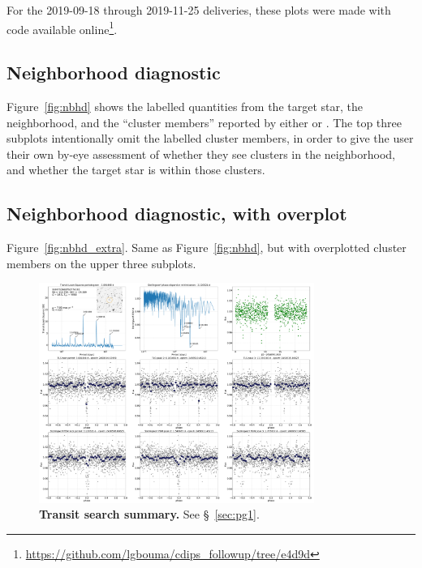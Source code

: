 \documentclass[12pt,twocolumn,tighten]{aastex62}
\begin{document}
For the 2019-09-18 through 2019-11-25 deliveries,
these plots were made with code available online\footnote{
\url{https://github.com/lgbouma/cdips_followup/tree/e4d9d}}.

\subsection{Neighborhood diagnostic}
\label{sec:nbhd}
Figure~\ref{fig:nbhd} shows the labelled quantities from
the target star, the neighborhood, and the ``cluster members'' reported by either
\citet{cantat-gaudin_gaia_2018} or \citet{Kharchenko_et_al_2013}.
The top three subplots intentionally omit the labelled
cluster members, in order to give the user their own by-eye
assessment of whether they see clusters in the neighborhood, and
whether the target star is within those clusters.

\subsection{Neighborhood diagnostic, with overplot}
\label{sec:nbdh_extra}
Figure~\ref{fig:nbhd_extra}.
Same as Figure~\ref{fig:nbhd}, but with overplotted cluster members
on the upper three subplots.


\begin{figure}[!h]
	\begin{center}
		\leavevmode
		\includegraphics[width=0.8\textwidth]{gaiatwo0005599752663752776192-0007_page01.pdf}
	\end{center}
	\vspace{-0.5cm}
	\caption{
    {\bf Transit search summary.} See \S~\ref{sec:pg1}.
		\label{fig:pg1}
	}
\end{figure}
\end{document}
